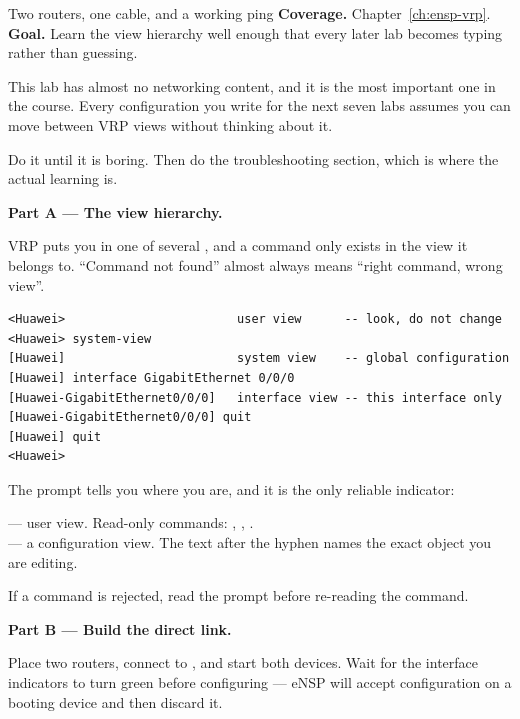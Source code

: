
\begin{labproject}{Two routers, one cable, and a working ping}
\textbf{Coverage.} Chapter~\ref{ch:ensp-vrp}.\\
\textbf{Goal.} Learn the view hierarchy well enough that every later lab becomes typing rather than guessing.

\begin{labmode}
This lab has almost no networking content, and it is the most important one in the course. Every configuration you write for the next seven labs assumes you can move between VRP views without thinking about it.

Do it until it is boring. Then do the troubleshooting section, which is where the actual learning is.
\end{labmode}

\medskip\noindent\textbf{Part A --- The view hierarchy.}\par
VRP puts you in one of several , and a command only exists in the view it belongs to. ``Command not found'' almost always means ``right command, wrong view''.

\begin{lstlisting}[style=dcnterminal]
<Huawei>                        user view      -- look, do not change
<Huawei> system-view
[Huawei]                        system view    -- global configuration
[Huawei] interface GigabitEthernet 0/0/0
[Huawei-GigabitEthernet0/0/0]   interface view -- this interface only
[Huawei-GigabitEthernet0/0/0] quit
[Huawei] quit
<Huawei>
\end{lstlisting}

\begin{keyidea}
The prompt tells you where you are, and it is the only reliable indicator:

 --- user view. Read-only commands: , , .\\
 --- a configuration view. The text after the hyphen names the exact object you are editing.

If a command is rejected, read the prompt before re-reading the command.
\end{keyidea}

\medskip\noindent\textbf{Part B --- Build the direct link.}\par
Place two routers, connect  to , and start both devices. Wait for the interface indicators to turn green before configuring --- eNSP will accept configuration on a booting device and then discard it.


\end{labproject}
